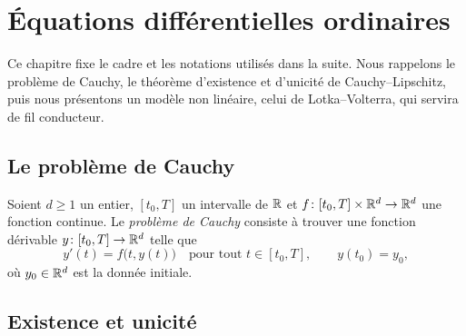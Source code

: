 \chapter{Équations différentielles ordinaires}\label{ch-edo}

Ce chapitre fixe le cadre et les notations utilisés dans la suite. Nous rappelons le problème de Cauchy, le théorème d'existence et d'unicité de Cauchy--Lipschitz, puis nous présentons un modèle non linéaire, celui de Lotka--Volterra, qui servira de fil conducteur.

\section{Le problème de Cauchy}\label{sec-cauchy}

Soient $d\ge 1$ un entier, $[t_0,T]$ un intervalle de $\mathbb{R}$ et $f\colon [t_0,T]\times\mathbb{R}^d\to\mathbb{R}^d$ une fonction continue. Le \emph{problème de Cauchy} consiste à trouver une fonction dérivable $y\colon[t_0,T]\to\mathbb{R}^d$ telle que
\begin{equation}\label{eq-cauchy}
  y'(t)=f\bigl(t,y(t)\bigr)\quad\text{pour tout } t\in[t_0,T],\qquad y(t_0)=y_0,
\end{equation}
où $y_0\in\mathbb{R}^d$ est la donnée initiale.


\section{Existence et unicité}\label{sec-cl}


